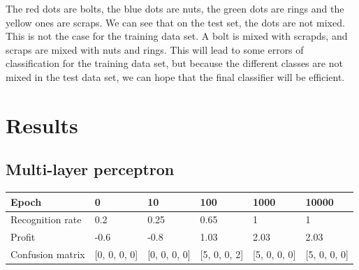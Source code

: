 \documentclass[]{article}
\begin{document}
The red dots are bolts, the blue dots are nuts, the green dots are rings and the yellow ones are scraps.
We can see that on the test set, the dots are not mixed. This is not the case for the training data set.
A bolt is mixed with scrapds, and scraps are mixed with nuts and rings.
This will lead to some errors of classification for the training data set, but because the different classes are not mixed in the test data set, we can hope that the final classifier will be efficient.

\section{Results}
\label{sec:results}

\subsection{Multi-layer perceptron}

\begin{center}
    \begin{tabularx}{\textwidth}{ | X | X | X | X | X | X | }
    \hline
    Epoch & 0 & 10 & 100 & 1000 & 10000 \\ \hline
    Recognition rate & 0.2 & 0.25 & 0.65 & 1 & 1 \\ \hline
    Profit & -0.6 & -0.8  & 1.03 & 2.03 & 2.03 \\ \hline
    Confusion matrix  & [0, 0, 0, 0] \newline [0, 0, 0, 0] \newline [0, 0, 0, 0] \newline [5, 6, 5, 4] & [0, 0, 0, 0] \newline [0, 0, 0, 0] \newline [5, 6, 5, 4] \newline [0, 0, 0, 0] & [5, 0, 0, 2] \newline [0, 2, 0, 1] \newline [0, 4, 5, 0] \newline [0, 0, 0, 1] & [5, 0, 0, 0] \newline [0, 6, 0, 0] \newline [0, 0, 5, 0] \newline [0, 0, 0, 4] & [5, 0, 0, 0] \newline [0, 6, 0, 0] \newline [0, 0, 5, 0] \newline [0, 0, 0, 4] \\
    \hline
    \end{tabularx}
\end{center}
\end{document}
